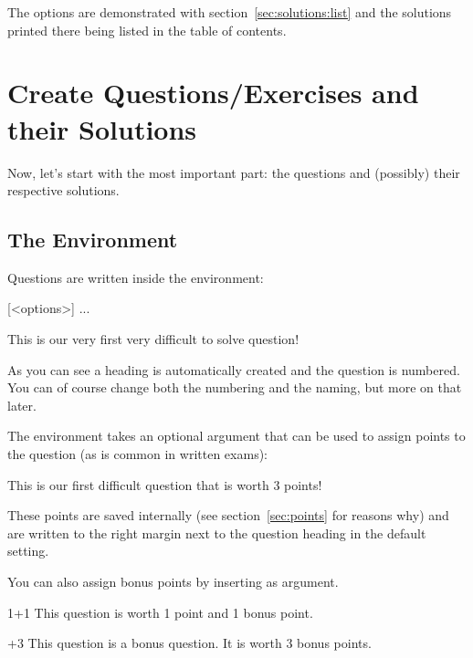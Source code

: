 \documentclass[DIV10,toc=index,toc=bib,numbers=noendperiod]{cnpkgdoc}
\begin{document}
The  options are demonstrated with section~\ref{sec:solutions:list}
and the solutions printed there being listed in the table of contents.


\section{Create Questions/Exercises and their Solutions}
Now, let's start with the most important part: the questions and (possibly)
their respective solutions.
\subsection{The  Environment}\label{ssec:questions}
Questions are written inside the  environment:
\begin{beschreibung}
  [<options>]{\unskip{} ... }
\end{beschreibung}
\begin{beispiel}
 \begin{question}
  This is our very first very difficult to solve question!
 \end{question}
\end{beispiel}
As you can see a heading is automatically created and the question is
numbered.  You can of course change both the numbering and the naming, but
more on that later.

The  environment takes an optional argument  that
can be used to assign points to the question (as is common in written exams):
\begin{beispiel}
 \begin{question}{3}
  This is our first difficult question that is worth 3 points!
 \end{question}
\end{beispiel}
These points are saved internally (see section~\ref{sec:points} for reasons
why) and are written to the right margin next to the question heading in the
default setting.

You can also assign bonus points by inserting  as
argument.
\begin{beispiel}
 \begin{question}{1+1}
  This question is worth 1 point and 1 bonus point.
 \end{question}
 \begin{question}{+3}
  This question is a bonus question. It is worth 3 bonus points.
 \end{question}
\end{beispiel}
\end{document}
